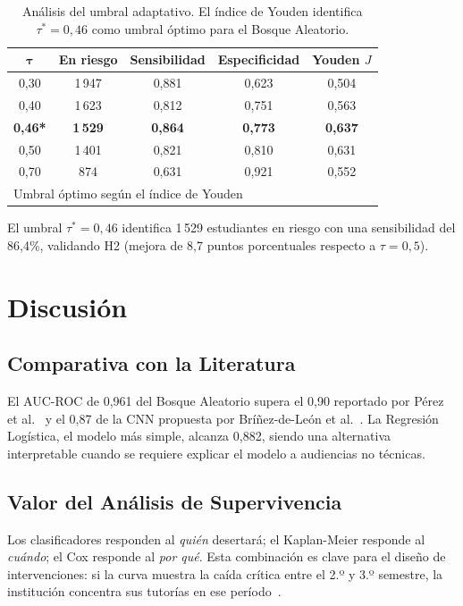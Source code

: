 \documentclass[12pt]{article}
\begin{document}
{\begin{table}[H]
\centering
\caption{Análisis del umbral adaptativo. El índice de Youden identifica
$\tau^* = 0{,}46$ como umbral óptimo para el Bosque Aleatorio.}
\label{tab:umbral}
\begin{tabular}{ccccc}
\toprule
$\boldsymbol{\tau}$ & \textbf{En riesgo} & \textbf{Sensibilidad} & \textbf{Especificidad} & \textbf{Youden $J$} \\
\midrule
0,30 & 1\,947 & 0,881 & 0,623 & 0,504 \\
0,40 & 1\,623 & 0,812 & 0,751 & 0,563 \\
\textbf{0,46*} & \textbf{1\,529} & \textbf{0,864} & \textbf{0,773} & \textbf{0,637} \\
0,50 & 1\,401 & 0,821 & 0,810 & 0,631 \\
0,70 &   874 & 0,631 & 0,921 & 0,552 \\
\bottomrule
\multicolumn{5}{l}{\small * Umbral óptimo según el índice de Youden}
\end{tabular}
\end{table}

El umbral $\tau^* = 0{,}46$ identifica 1\,529 estudiantes en riesgo con una
sensibilidad del 86,4\%, validando H2 (mejora de 8,7 puntos porcentuales respecto a
$\tau = 0{,}5$).

\section{Discusión}

\subsection{Comparativa con la Literatura}

El AUC-ROC de 0,961 del Bosque Aleatorio supera el 0,90 reportado por Pérez et
al.~\cite{perez2020} y el 0,87 de la CNN propuesta por Bríñez-de-León et
al.~\cite{brinez2025}. La Regresión Logística, el modelo más simple, alcanza 0,882,
siendo una alternativa interpretable cuando se requiere explicar el modelo a audiencias
no técnicas.

\subsection{Valor del Análisis de Supervivencia}

Los clasificadores responden al \emph{quién} desertará; el Kaplan-Meier responde al
\emph{cuándo}; el Cox responde al \emph{por qué}. Esta combinación es clave para el
diseño de intervenciones: si la curva muestra la caída crítica entre el 2.º y 3.º
semestre, la institución concentra sus tutorías en ese período~\cite{men2008_cap4}.

}
\end{document}
